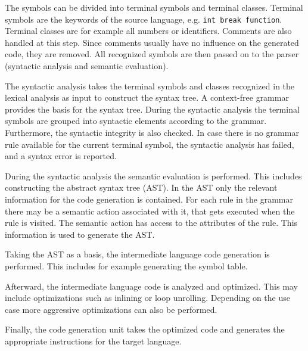 The symbols can be divided into terminal symbols and terminal classes. Terminal symbols are the keywords of the source language, e.g. \texttt{int break function}. Terminal classes are for example all numbers or identifiers. Comments are also handled at this step. Since comments usually have no influence on the generated code, they are removed. All recognized symbols are then passed on to the parser (syntactic analysis and semantic evaluation). 



The syntactic analysis takes the terminal symbols and classes recognized in the lexical analysis as input to construct the syntax tree. A context-free grammar provides the basis for the syntax tree. During the syntactic analysis the terminal symbols are grouped into syntactic elements according to the grammar. Furthermore, the syntactic integrity is also checked. In case there is no grammar rule available for the current terminal symbol, the syntactic analysis has failed, and a syntax error is reported.


During the syntactic analysis the semantic evaluation is performed. This includes constructing the abstract syntax tree (AST). In the AST only the relevant information for the code generation is contained. For each rule in the grammar there may be a semantic action associated with it, that gets executed when the rule is visited. The semantic action has access to the attributes of the rule. This information is used to generate the AST.  

Taking the AST as a basis, the intermediate language code generation is performed. This includes for example generating the symbol table. 

Afterward, the intermediate language code is analyzed and optimized. This may include optimizations such as inlining or loop unrolling. Depending on the use case more aggressive optimizations can also be performed. 

Finally, the code generation unit takes the optimized code and generates the appropriate instructions for the target language. 